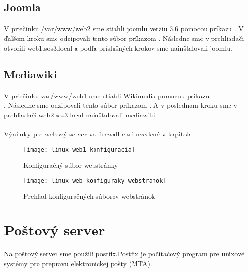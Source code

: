 \subsection{Joomla}
\paragraph{}
V priečinku /var/www/web2 sme stiahli joomlu verziu 3.6 pomocou príkazu  . V ďalšom kroku sme odzipovali tento súbor príkazom  . Nás\-ledne sme v prehliadači otvorili web1.sos3.local a podľa príslušných krokov sme nainštalovali joomlu.

\subsection{Mediawiki}
\paragraph{}
V priečinku var/www/web1 sme stiahli Wikimedia pomocou príkazu\\  . Následne sme odzipovali tento súbor príkazom  . A v poslednom kroku sme v prehliadači web2.sos3.local nainštalovali mediawiki.

\paragraph{}
Výnimky pre webový server vo firewall-e sú uvedené v kapitole .

\begin{figure}[!htb]
\centering
\texttt{[image: linux\_web1\_konfiguracia]}
\caption{Konfiguračný súbor webstránky}
\label{fig:web1_config_file}
\end{figure}

\begin{figure}[!htb]
\centering
\texttt{[image: linux\_web\_konfiguraky\_webstranok]}
\caption{Prehľad konfiguračných súborov webstránok}
\label{fig:web_config_files_list}
\end{figure}

\section{Poštový server}
\paragraph{}
Na poštový server sme použili postfix.Postfix je počítačový program pre unixové systémy pro prepravu elektronickej pošty (MTA).
